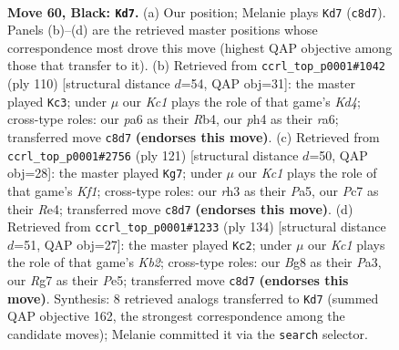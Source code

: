 \documentclass[11pt]{article}
\begin{document}
\clearpage

\begin{figure}[p]\centering
\begin{subfigure}{0.46\textwidth}\centering
\resizebox{\linewidth}{!}{%
\newchessgame
\chessboard[
  setfen={1rk3b1/p1p3r1/P1p3p1/2P2p1p/RP3P1P/7R/5K2/1N6 b - - 43 60},
  showmover=false,
  pgfstyle=straightmove, color=movearrow, markmove={c8-d7}
]}
\caption{}
\end{subfigure}\hfill
\begin{subfigure}{0.46\textwidth}\centering
\resizebox{\linewidth}{!}{%
\newchessgame
\chessboard[
  setfen={6r1/3pk3/r3p1p1/4P2p/PR1K1P1P/1P4R1/8/8 w - - 7 56},
  showmover=false,
  pgfstyle=straightmove, color=movearrow, markmove={d4-c3}
]}
\caption{}
\end{subfigure}
\\[4pt]
\begin{subfigure}{0.46\textwidth}\centering
\resizebox{\linewidth}{!}{%
\newchessgame
\chessboard[
  setfen={5k2/2p2r2/1p1p4/pP5R/P1PPr1p1/3R2P1/5P2/5K2 b - - 4 61},
  showmover=false,
  pgfstyle=straightmove, color=movearrow, markmove={f8-g7}
]}
\caption{}
\end{subfigure}\hfill
\begin{subfigure}{0.46\textwidth}\centering
\resizebox{\linewidth}{!}{%
\newchessgame
\chessboard[
  setfen={8/p3k3/r1p1p3/1p2Pp2/1P1P2p1/P1R3P1/1K3P1r/5R2 w - - 4 68},
  showmover=false,
  pgfstyle=straightmove, color=movearrow, markmove={b2-c2}
]}
\caption{}
\end{subfigure}
\caption{\textbf{Move 60, Black: \texttt{Kd7}.} (a) Our position; Melanie plays \texttt{Kd7} (\texttt{c8d7}). Panels (b)--(d) are the retrieved master positions whose correspondence most drove this move (highest QAP objective among those that transfer to it). (b) Retrieved from \texttt{ccrl\_top\_p0001\#1042} (ply 110) [structural distance $d$=54, QAP obj=31]: the master played \texttt{Kc3}; under $\mu$ our \emph{Kc1} plays the role of that game's \emph{Kd4}; cross-type roles: our \emph{p}a6 as their \emph{R}b4, our \emph{p}h4 as their \emph{r}a6; transferred move \texttt{c8d7} \textbf{(endorses this move)}. (c) Retrieved from \texttt{ccrl\_top\_p0001\#2756} (ply 121) [structural distance $d$=50, QAP obj=28]: the master played \texttt{Kg7}; under $\mu$ our \emph{Kc1} plays the role of that game's \emph{Kf1}; cross-type roles: our \emph{r}h3 as their \emph{P}a5, our \emph{P}c7 as their \emph{R}e4; transferred move \texttt{c8d7} \textbf{(endorses this move)}. (d) Retrieved from \texttt{ccrl\_top\_p0001\#1233} (ply 134) [structural distance $d$=51, QAP obj=27]: the master played \texttt{Kc2}; under $\mu$ our \emph{Kc1} plays the role of that game's \emph{Kb2}; cross-type roles: our \emph{B}g8 as their \emph{P}a3, our \emph{R}g7 as their \emph{P}e5; transferred move \texttt{c8d7} \textbf{(endorses this move)}. Synthesis: 8 retrieved analogs transferred to \texttt{Kd7} (summed QAP objective 162, the strongest correspondence among the candidate moves); Melanie committed it via the \texttt{search} selector.}
\label{fig:thought-m119}
\end{figure}
\end{document}
